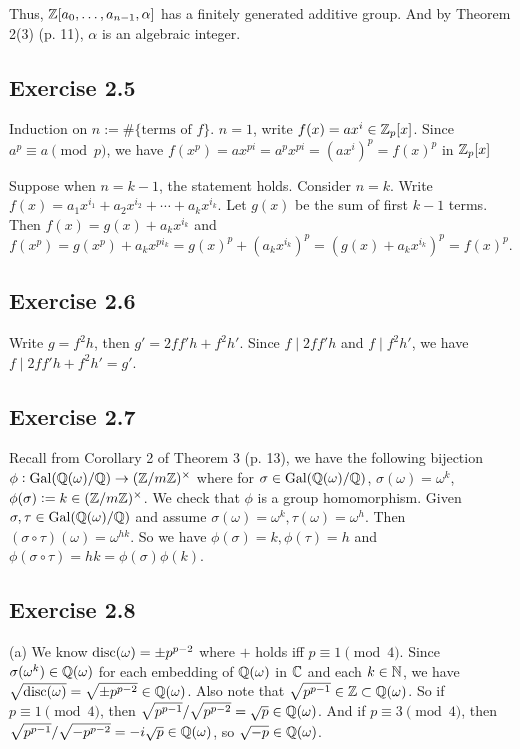 \documentclass[../Marcus.tex]{subfiles}
\begin{document}
Thus, $\mathbb{Z}[a_0,\ldots,a_{n-1},\alpha]$ has a finitely generated additive group. And by Theorem 2(3) (p. 11), $\alpha$ is an algebraic integer.

\subsection*{Exercise 2.5}

Induction on $n:=\#\{\text{terms of }f\}$. $n=1$, write $f(x)=ax^i \in \mathbb{Z}_p[x]$. Since $a^p \equiv a \pmod{p}$, we have $f(x^p)=ax^{pi}=a^px^{pi}=(ax^i)^p=f(x)^p$ in $\mathbb{Z}_p[x]$

Suppose when $n=k-1$, the statement holds. Consider $n=k$. Write $f(x)=a_1x^{i_1}+a_2x^{i_2}+\cdots+a_kx^{i_k}$. Let $g(x)$ be the sum of first $k-1$ terms. Then $f(x)=g(x)+a_kx^{i_k}$ and 
$$
f(x^p)=g(x^p)+a_kx^{pi_k}=g(x)^p+(a_kx^{i_k})^p=\left(g(x)+a_kx^{i_k}\right)^p=f(x)^p.
$$

\subsection*{Exercise 2.6}

Write $g=f^2h$, then $g'=2ff'h+f^2h'$. Since $f\mid 2ff'h$ and $f\mid f^2h'$, we have $f\mid 2ff'h+f^2h'=g'$.

\subsection*{Exercise 2.7}

Recall from Corollary 2 of Theorem 3 (p. 13), we have the following bijection $\phi: \operatorname{Gal}(\mathbb{Q}(\omega)/\mathbb{Q})\to(\mathbb{Z}/m\mathbb{Z})^{\times}$ where for $\sigma\in \operatorname{Gal}(\mathbb{Q}(\omega)/\mathbb{Q})$, $\sigma(\omega)=\omega^k$, $\phi(\sigma):=k\in(\mathbb{Z}/m\mathbb{Z})^{\times}$. We check that $\phi$ is a group homomorphism. Given $\sigma,\tau\in\operatorname{Gal}(\mathbb{Q}(\omega)/\mathbb{Q})$ and assume $\sigma(\omega)=\omega^k,\tau(\omega)=\omega^h$. Then $(\sigma\circ\tau)(\omega)=\omega^{hk}$. So we have $\phi(\sigma)=k, \phi(\tau)=h$ and $\phi(\sigma\circ\tau)=hk=\phi(\sigma)\phi(k)$.

\subsection*{Exercise 2.8}

(a) We know
$\operatorname{disc}(\omega)=\pm p^{p-2}$ where $+$ holds iff $p\equiv 1 \pmod{4}$. Since $\sigma(\omega^k)\in\mathbb{Q}(\omega)$ for each embedding of $\mathbb{Q}(\omega)$ in $\mathbb{C}$ and each $k\in\mathbb{N}$, we have $\sqrt{\operatorname{disc}(\omega)}=\sqrt{\pm p^{p-2}} \in \mathbb{Q}(\omega)$. Also note that $\sqrt{p^{p-1}} \in \mathbb{Z} \subset \mathbb{Q}(\omega)$. So if $p\equiv 1 \pmod{4}$, then $\sqrt{p^{p-1}}/\sqrt{p^{p-2}} = \sqrt{p} \in \mathbb{Q}(\omega)$. And if $p\equiv 3 \pmod{4}$, then $\sqrt{p^{p-1}}/\sqrt{-p^{p-2}} = -i\sqrt{p} \in \mathbb{Q}(\omega)$, so $\sqrt{-p}\in\mathbb{Q}(\omega)$.
\end{document}
